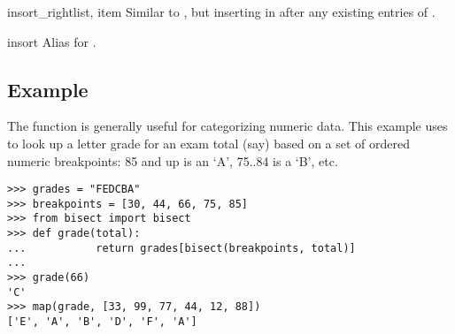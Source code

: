 \begin{funcdesc}{insort_right}{list, item}
  Similar to , but inserting  in
   after any existing entries of .
\end{funcdesc}

\begin{funcdesc}{insort}{\unspecified}
  Alias for .
\end{funcdesc}


\subsection{Example}

The  function is generally useful for categorizing
numeric data.  This example uses  to look up a
letter grade for an exam total (say) based on a set of ordered numeric
breakpoints: 85 and up is an `A', 75..84 is a `B', etc.

\begin{verbatim}
>>> grades = "FEDCBA"
>>> breakpoints = [30, 44, 66, 75, 85]
>>> from bisect import bisect
>>> def grade(total):
...           return grades[bisect(breakpoints, total)]
...
>>> grade(66)
'C'
>>> map(grade, [33, 99, 77, 44, 12, 88])
['E', 'A', 'B', 'D', 'F', 'A']
\end{verbatim}

